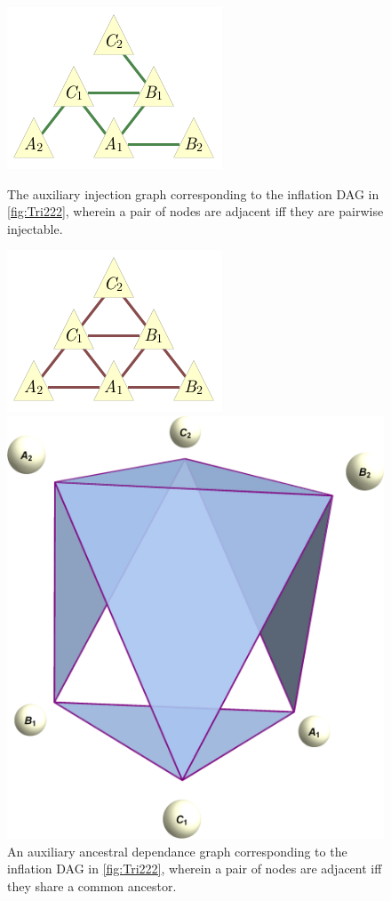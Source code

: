 \begin{figure}[t]
\centering
\begin{minipage}[b]{0.3\linewidth}
\centering
\includegraphics[scale=1]{injectiongraph222.pdf}
\caption{The auxiliary injection graph corresponding to the inflation DAG in \cref{fig:Tri222}, wherein a pair of nodes are adjacent iff they are pairwise injectable.}\label{fig:injection222}
\end{minipage}
\hfill
\begin{minipage}[b]{0.3\linewidth}
\centering
\includegraphics[scale=1]{ancestraldependancegraph222.pdf}
\caption{An auxiliary ancestral dependance graph corresponding to the inflation DAG in \cref{fig:Tri222}, wherein a pair of nodes are adjacent iff they share a common ancestor.}\label{fig:dependances222}
\end{minipage}
\hfill
\begin{minipage}[b]{0.3\linewidth}
\centering
\includegraphics[scale=0.2]{simplicialcomplex.pdf}

\end{minipage}
\end{figure}
